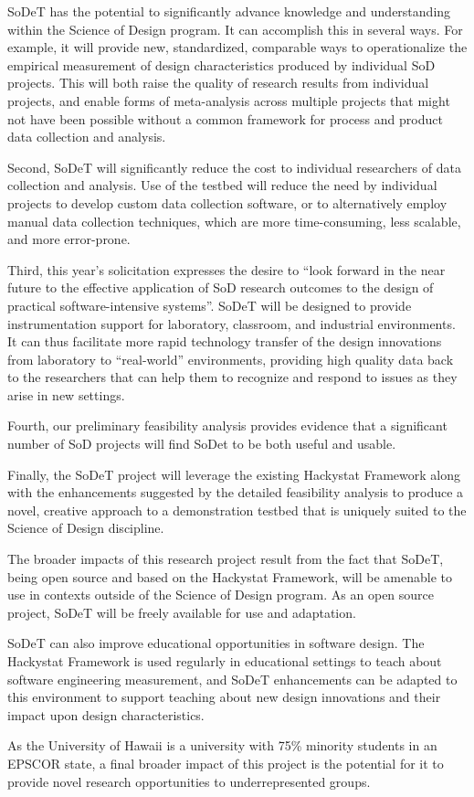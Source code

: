 SoDeT has the potential to significantly advance knowledge and
understanding within the Science of Design program.  It can accomplish this
in several ways. For example, it will provide new, standardized, comparable ways
to operationalize the empirical measurement of design characteristics
produced by individual SoD projects.  This will both raise the quality of
research results from individual projects, and enable forms of
meta-analysis across multiple projects that might not have been possible
without a common framework for process and product data collection and
analysis.

Second, SoDeT will significantly reduce the cost to individual
researchers of data collection and analysis. Use of the testbed will reduce the
need by individual projects to develop custom data collection software, or
to alternatively employ manual data collection techniques, which are more
time-consuming, less scalable, and more error-prone.

Third, this year's solicitation expresses the desire to ``look forward in
the near future to the effective application of SoD research outcomes to
the design of practical software-intensive systems''.  SoDeT will be
designed to provide instrumentation support for laboratory, classroom, and
industrial environments.  It can thus facilitate more rapid technology
transfer of the design innovations from laboratory to ``real-world''
environments, providing high quality data back to the researchers that can
help them to recognize and respond to issues as they arise in new settings.

Fourth, our preliminary feasibility analysis provides evidence that a significant number of SoD
projects will find SoDet to be both useful and usable.

Finally, the SoDeT project will leverage the existing
Hackystat Framework along with the enhancements suggested by the detailed
feasibility analysis to produce a novel, creative approach to a
demonstration testbed that is uniquely suited to the Science of Design
discipline.

The broader impacts of this research project result from the fact that
SoDeT, being open source and based on the Hackystat Framework, will be
amenable to use in contexts outside of the Science of Design program. As an
open source project, SoDeT will be freely available for use and adaptation.

SoDeT can also improve educational opportunities in software
design.  The Hackystat Framework is used regularly in educational settings
to teach about software engineering measurement, and SoDeT
enhancements can be adapted to this environment to support teaching about
new design innovations and their impact upon design characteristics.

As the University of Hawaii is a university with 75\% minority students in
an EPSCOR state, a final broader impact of this project is the potential
for it to provide novel research opportunities to underrepresented groups.




